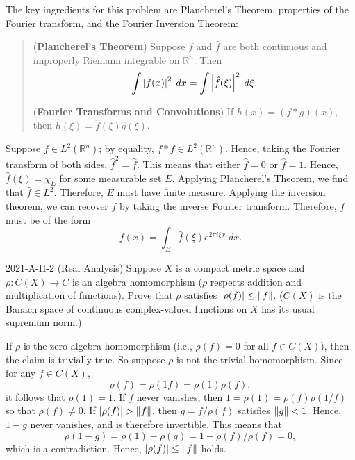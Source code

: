 \documentclass{article}
\begin{document}
\begin{solutions}
	The key ingredients for this problem are Plancherel's Theorem, properties of the Fourier transform, and the Fourier Inversion Theorem: 
		\begin{quote}
			(\textbf{Plancherel's Theorem}) Suppose $f$ and $\hat{f}$ are both continuous and improperly Riemann integrable on $\mathbb{R}^{n}$. Then 
				\begin{equation}
					\int \left| f(x) \right|^{2}\;dx = \int \left| \hat{f}(\xi) \right|^{2}\;d\xi. 
				\end{equation}
				
			(\textbf{Fourier Transforms and Convolutions}) If $h(x) = (f \ast g)(x)$, then $\hat{h}(\xi) = \hat{f}(\xi)\hat{g}(\xi)$. 
		\end{quote}
	Suppose $f \in L^{2}(\mathbb{R}^{n})$; by equality, $f \ast f \in L^{2}(\mathbb{R}^{n})$. Hence, taking the Fourier transform of both sides, $\hat{f}^{2} = \hat{f}$. This means that either $\hat{f} = 0$ or $\hat{f} = 1$. Hence, $\hat{f}(\xi) = \chi_{E}$ for some measurable set $E$. Applying Plancherel's Theorem, we find that $\hat{f} \in L^{2}$. Therefore, $E$ must have finite measure. Applying the inversion theorem, we can recover $f$ by taking the inverse Fourier transform. Therefore, $f$ must be of the form 
		\begin{equation}
			f(x) = \int_{E}\hat{f}(\xi)e^{2\pi i \xi x}\;dx. 
		\end{equation}
\end{solutions}
\begin{prb}{2021-A-II-2 (Real Analysis)}
	Suppose $X$ is a compact metric space and $\rho: C(X) \to C$ is an algebra homomorphism ($\rho$ respects addition and multiplication of functions). Prove that $\rho$ satisfies $\left| \rho(f) \right| \leq \left\Vert f \right\Vert$. ($C(X)$ is the Banach space of continuous complex-valued functions on $X$ has its usual supremum norm.)
\end{prb}
\begin{solutions}
	If $\rho$ is the zero algebra homomorphism (i.e., $\rho(f) = 0$ for all $f \in C(X)$), then the claim is trivially true. So suppose $\rho$ is not the trivial homomorphism. Since for any $f \in C(X)$, 
		\begin{equation}
			\rho(f) = \rho(1f) =\rho(1)\rho(f), 
		\end{equation}
	it follows that $\rho(1) = 1$. If $f$ never vanishes, then $1 = \rho(1) = \rho(f)\rho(1/f)$ so that $\rho(f) \neq 0$. If $\left| \rho(f) \right| > \left\Vert f \right\Vert$, then $g = f/\rho(f)$ satisfies $\left\Vert g \right\Vert < 1$. Hence, $1 - g$ never vanishes, and is therefore invertible. This means that 
		\begin{equation}
			\rho(1 - g) = \rho(1) - \rho(g) = 1 - \rho(f)/\rho(f) = 0, 
		\end{equation}
	which is a contradiction. Hence, $\left| \rho(f) \right| \leq \left\Vert f \right\Vert$ holds. 
\end{solutions}
\end{document}
